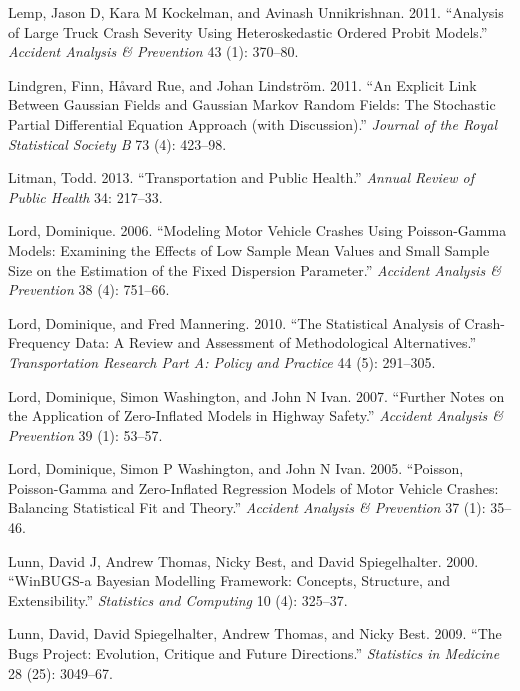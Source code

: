 \documentclass[12pt]{book}
\numberwithin{equation}{chapter}
\begin{document}
\leavevmode\hypertarget{ref-lemp2011analysis}{}%
Lemp, Jason D, Kara M Kockelman, and Avinash Unnikrishnan. 2011. ``Analysis of Large Truck Crash Severity Using Heteroskedastic Ordered Probit Models.'' \emph{Accident Analysis \& Prevention} 43 (1): 370--80.

\leavevmode\hypertarget{ref-Lindgren2011}{}%
Lindgren, Finn, Håvard Rue, and Johan Lindström. 2011. ``An Explicit Link Between Gaussian Fields and Gaussian Markov Random Fields: The Stochastic Partial Differential Equation Approach (with Discussion).'' \emph{Journal of the Royal Statistical Society B} 73 (4): 423--98.

\leavevmode\hypertarget{ref-litman2013transportation}{}%
Litman, Todd. 2013. ``Transportation and Public Health.'' \emph{Annual Review of Public Health} 34: 217--33.

\leavevmode\hypertarget{ref-lord2006modeling}{}%
Lord, Dominique. 2006. ``Modeling Motor Vehicle Crashes Using Poisson-Gamma Models: Examining the Effects of Low Sample Mean Values and Small Sample Size on the Estimation of the Fixed Dispersion Parameter.'' \emph{Accident Analysis \& Prevention} 38 (4): 751--66.

\leavevmode\hypertarget{ref-lord2010statistical}{}%
Lord, Dominique, and Fred Mannering. 2010. ``The Statistical Analysis of Crash-Frequency Data: A Review and Assessment of Methodological Alternatives.'' \emph{Transportation Research Part A: Policy and Practice} 44 (5): 291--305.

\leavevmode\hypertarget{ref-lord2007further}{}%
Lord, Dominique, Simon Washington, and John N Ivan. 2007. ``Further Notes on the Application of Zero-Inflated Models in Highway Safety.'' \emph{Accident Analysis \& Prevention} 39 (1): 53--57.

\leavevmode\hypertarget{ref-lord2005poisson}{}%
Lord, Dominique, Simon P Washington, and John N Ivan. 2005. ``Poisson, Poisson-Gamma and Zero-Inflated Regression Models of Motor Vehicle Crashes: Balancing Statistical Fit and Theory.'' \emph{Accident Analysis \& Prevention} 37 (1): 35--46.

\leavevmode\hypertarget{ref-lunn2000winbugs}{}%
Lunn, David J, Andrew Thomas, Nicky Best, and David Spiegelhalter. 2000. ``WinBUGS-a Bayesian Modelling Framework: Concepts, Structure, and Extensibility.'' \emph{Statistics and Computing} 10 (4): 325--37.

\leavevmode\hypertarget{ref-lunn2009bugs}{}%
Lunn, David, David Spiegelhalter, Andrew Thomas, and Nicky Best. 2009. ``The Bugs Project: Evolution, Critique and Future Directions.'' \emph{Statistics in Medicine} 28 (25): 3049--67.
\end{document}
